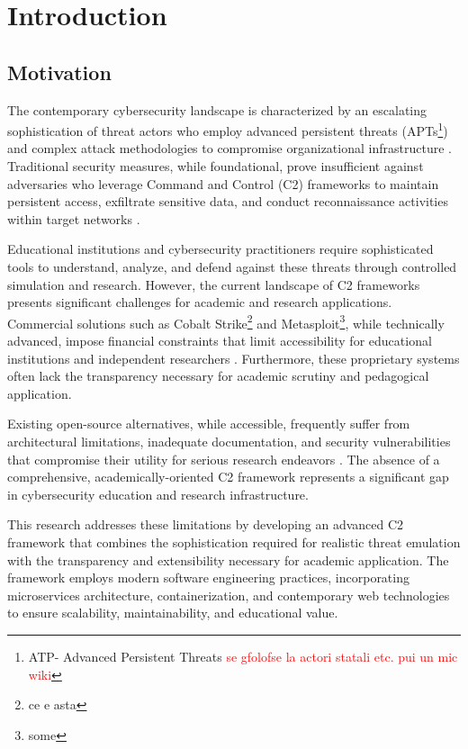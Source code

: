 \chapter{Introduction}
\label{chapter:introduction}

\section{ Motivation}
\label{sec:motivation}

The contemporary cybersecurity landscape is characterized by an escalating sophistication of threat actors who employ advanced persistent threats (APTs\footnote{ATP- Advanced Persistent Threats \textcolor{red}{se gfolofse la actori statali etc. pui un mic wiki}}) and complex attack methodologies to compromise organizational infrastructure \cite{hutchins2011intelligence}. Traditional security measures, while foundational, prove insufficient against adversaries who leverage Command and Control (C2) frameworks to maintain persistent access, exfiltrate sensitive data, and conduct reconnaissance activities within target networks \cite{caltagirone2013diamond}.

Educational institutions and cybersecurity practitioners require sophisticated tools to understand, analyze, and defend against these threats through controlled simulation and research. However, the current landscape of C2 frameworks presents significant challenges for academic and research applications. Commercial solutions such as Cobalt Strike\footnote{ce e asta} and Metasploit\footnote{some}, while technically advanced, impose financial constraints that limit accessibility for educational institutions and independent researchers \cite{red2019adversary}. Furthermore, these proprietary systems often lack the transparency necessary for academic scrutiny and pedagogical application.

Existing open-source alternatives, while accessible, frequently suffer from architectural limitations, inadequate documentation, and security vulnerabilities that compromise their utility for serious research endeavors \cite{mitre2023attack}. The absence of a comprehensive, academically-oriented C2 framework represents a significant gap in cybersecurity education and research infrastructure.

This research addresses these limitations by developing an advanced C2 framework that combines the sophistication required for realistic threat emulation with the transparency and extensibility necessary for academic application. The framework employs modern software engineering practices, incorporating microservices architecture, containerization, and contemporary web technologies to ensure scalability, maintainability, and educational value.

